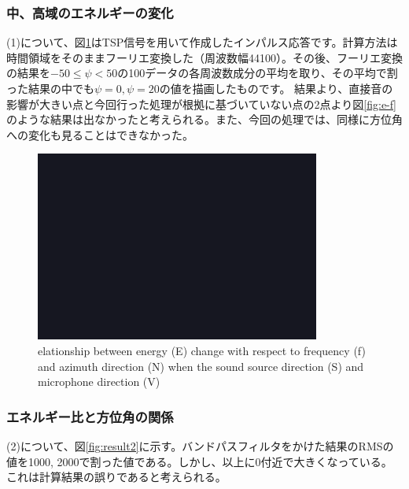 \subsubsection{中、高域のエネルギーの変化}
(1)について、図\ref{fig:result1}はTSP信号を用いて作成したインパルス応答です。計算方法は時間領域をそのままフーリエ変換した（周波数幅44100）。その後、フーリエ変換の結果を$-50 \leq \psi <50$の100データの各周波数成分の平均を取り、その平均で割った結果の中でも$\psi=0, \psi=20$の値を描画したものです。
結果より、直接音の影響が大きい点と今回行った処理が根拠に基づいていない点の2点より図\ref{fig:e-f}のような結果は出なかったと考えられる。また、今回の処理では、同様に方位角への変化も見ることはできなかった。

\begin{figure}[t]
  \begin{center}
  \vspace{1zh}
    \includegraphics[width=0.7\linewidth]{images/fig_sample.png}   
  \end{center}
  \caption{elationship between energy (E) change with respect to frequency (f) and azimuth direction (N) when the sound source direction (S) and microphone direction (V)}
  \label{fig:result1}
\end{figure}

\subsubsection{エネルギー比と方位角の関係}
(2)について、図\ref{fig:result2}に示す。バンドパスフィルタをかけた結果のRMSの値を1000, 2000で割った値である。しかし、以上に0付近で大きくなっている。これは計算結果の誤りであると考えられる。

